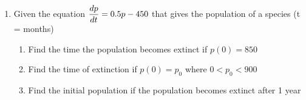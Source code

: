\begin{multicols*}{2}
\begin{enumerate}
		\item Given the equation $\dfrac{d p}{d t} = 0.5p - 450$ that gives the population of a species (t = months)		\begin{enumerate}
			\item Find the time the population becomes extinct if $p(0) = 850$
			\item Find the time of extinction if $p(0) = p_0$ where $0 < p_0 < 900$
			\item Find the initial population if the population becomes extinct after 1 year 
		\end{enumerate}
	\end{enumerate}
\end{multicols*}